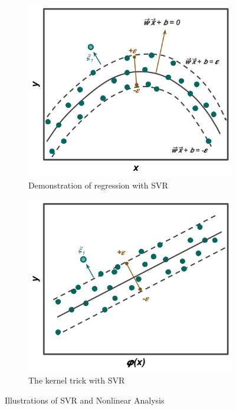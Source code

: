 \begin{figure}[!hp]
  \centering
  \begin{subfigure}[h]{0.8\linewidth}
    \includegraphics[width=\linewidth]{./chapters/litrev/svr-a.png}
    \caption{Demonstration of regression with \gls{SVR}}
    \label{fig:svr-a}
  \end{subfigure}
  \begin{subfigure}[h]{0.8\linewidth}
    \includegraphics[width=\linewidth]{./chapters/litrev/svr-b.png}
    \caption{The kernel trick with \gls{SVR}}
    \label{fig:svr-b}
  \end{subfigure}
  \caption{Illustrations of SVR and Nonlinear Analysis}
  \label{fig:svr}
\end{figure}

